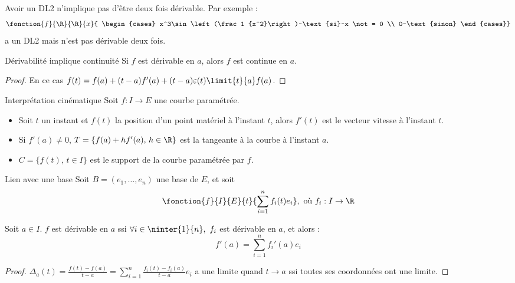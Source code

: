 \begin{remarque}
Avoir un DL2 n'implique pas d'être deux fois dérivable.
Par exemple :
\[\fonction{f}{\R}{\R}{x}{
    \begin{cases} x^3\sin\left(\frac 1 {x^2}\right)~\text{si}~x \not = 0 \\
    0~\text{sinon}
    \end{cases}}
\]
a un DL2 mais n'est pas dérivable deux fois.
\end{remarque}

\begin{corollaire}{Dérivabilité implique continuité}{}
    Si $f$ est dérivable en $a$, alors $f$ est continue en $a$.
\end{corollaire}

\begin{proof}
    En ce cas $f(t) = f(a) + (t-a)f'(a) + (t-a)\varepsilon(t) \limit{t}{a} f(a)$.
\end{proof}

\begin{definition}{Interprétation cinématique}{}
    Soit $f : I \to E$ une courbe paramétrée. 

    \begin{itemize}
        \item Soit $t$ un instant et $f(t)$ la position d'un point matériel à l'instant 
        $t$, alors $f'(t)$ est le vecteur vitesse à l'instant $t$. 

        \item Si $f'(a) \neq 0$, $T = \{ f(a) + hf'(a), \, h \in \R\}$ est la tangeante à la courbe à l'instant 
        $a$. 

        \item $C = \{ f(t), \, t \in I\}$ est le support de la courbe paramétrée par $f$.  
    \end{itemize}
\end{definition}

\begin{proposition}{Lien avec une base}{}
    Soit $B = (e_1, \ldots, e_n)$ une base de $E$, et soit 
    \[\fonction{f}{I}{E}{t}{\sum_{i=1}^n f_i(t)e_i},~\text{où}~f_i : I \to \R\]

    Soit $a \in I$. $f$ est dérivable en $a$ ssi $\forall i \in \ninter{1}{n},~f_i$
    est dérivable en $a$, et alors :
    \[f'(a) = \sum_{i=1}^n f_i'(a)e_i\]
\end{proposition}

\begin{proof}
    $\Delta_a(t) = \displaystyle \frac{f(t) - f(a)}{t-a} = \sum_{i=1}^n \frac{f_i(t) - f_i(a)}{t-a}e_i$ a 
    une limite quand $t \to a $ ssi toutes ses coordonnées ont une limite.
\end{proof}

